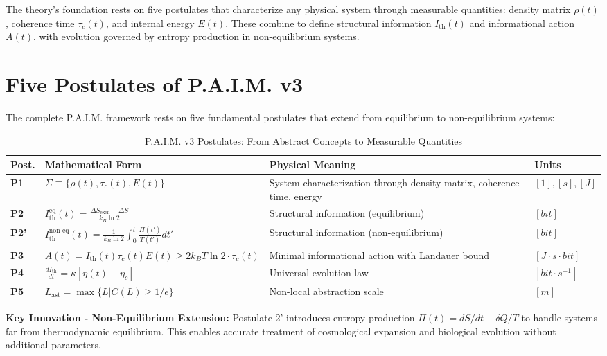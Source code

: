 \documentclass[twocolumn,10pt]{IEEEtran}
\begin{document}
The theory's foundation rests on five postulates that characterize any physical system through measurable quantities: density matrix $\rho(t)$, coherence time $\tau_c(t)$, and internal energy $E(t)$. These combine to define structural information $I_{\text{th}}(t)$ and informational action $A(t)$, with evolution governed by entropy production in non-equilibrium systems.

\section{Five Postulates of P.A.I.M. v3}

The complete P.A.I.M. framework rests on five fundamental postulates that extend from equilibrium to non-equilibrium systems:

\begin{table}[!t]
\centering
\caption{P.A.I.M. v3 Postulates: From Abstract Concepts to Measurable Quantities}
\label{tab:postulates}
\small
\begin{tabular}{|p{0.8cm}|p{3.2cm}|p{2.8cm}|p{1.2cm}|}
\hline
\textbf{Post.} & \textbf{Mathematical Form} & \textbf{Physical Meaning} & \textbf{Units} \\
\hline
\textbf{P1} & $\Sigma \equiv \{\rho(t), \tau_c(t), E(t)\}$ & System characterization through density matrix, coherence time, energy & $[1], [s], [J]$ \\
\hline
\textbf{P2} & $I_{\text{th}}^{\text{eq}}(t) = \frac{\Delta S_{\text{exch}} - \Delta S}{k_B \ln 2}$ & Structural information (equilibrium) & $[bit]$ \\
\hline
\textbf{P2'} & $I_{\text{th}}^{\text{non-eq}}(t) = \frac{1}{k_B \ln 2}\int_0^t \frac{\Pi(t')}{T(t')} dt'$ & Structural information (non-equilibrium) & $[bit]$ \\
\hline
\textbf{P3} & $A(t) = I_{\text{th}}(t) \tau_c(t) E(t) \geq 2k_B T \ln 2 \cdot \tau_c(t)$ & Minimal informational action with Landauer bound & $[J \cdot s \cdot bit]$ \\
\hline
\textbf{P4} & $\frac{dI_{\text{th}}}{dt} = \kappa[\eta(t) - \eta_c]$ & Universal evolution law & $[bit \cdot s^{-1}]$ \\
\hline
\textbf{P5} & $L_{\text{ast}} = \max\{L | C(L) \geq 1/e\}$ & Non-local abstraction scale & $[m]$ \\
\hline
\end{tabular}
\end{table}

\textbf{Key Innovation - Non-Equilibrium Extension:} Postulate 2' introduces entropy production $\Pi(t) = dS/dt - \delta Q/T$ to handle systems far from thermodynamic equilibrium. This enables accurate treatment of cosmological expansion and biological evolution without additional parameters.
\end{document}
